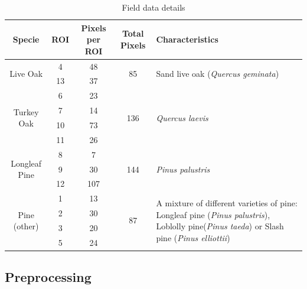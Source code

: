\documentclass[remotesensing,article,accept,moreauthors,pdftex,12pt,a4paper]{mdpi}
\begin{document}
\begin{table}
\begin{center}

    \begin{tabular}{ | c | c | c | c | p{7cm} | }
    \hline
    Specie & ROI & Pixels per ROI & Total Pixels & Characteristics \\
    \hline
    \multirow{2}{*}{Live Oak} & 4  & 48 & \multirow{2}{*}{85} & \multirow{2}{*}{Sand live oak (\textit{Quercus geminata})} \\ 
 & 13 & 37 & & \\    
    \hline
    \multirow{4}{*}{Turkey Oak} & 6 & 23 &\multirow{4}{*}{136} & \multirow{4}{*}{\textit{Quercus laevis}} \\ 
     & 7 & 14 & & \\    
     & 10 & 73 &  & \\    
     & 11 & 26 & & \\    
    \hline
    \multirow{3}{*}{Longleaf Pine} & 8 & 7 & \multirow{3}{*}{144} & \multirow{3}{*}{\textit{Pinus palustris}} \\ 
     & 9 & 30 &  & \\    
     & 12 & 107 & & \\
     \hline
    \multirow{4}{*}{Pine (other)} & 1 & 13 & \multirow{4}{*}{87} & \multirow{4}{7cm}{A mixture of different varieties of pine:  Longleaf pine (\textit{Pinus palustris}), Loblolly pine(\textit{Pinus taeda}) or Slash pine (\textit{Pinus elliottii})} \\
     & 2 & 30 & & \\    
     & 3 & 20 & & \\    
     & 5 & 24 & & \\
    \hline
    
    \end{tabular}
    \caption{Field data details}
    \label{table:field data}
    \end{center}

\end{table}








\subsection{Preprocessing}
\end{document}

